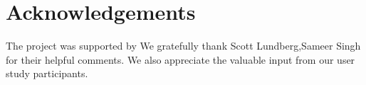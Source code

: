 \section*{Acknowledgements}
The project was supported by 
We gratefully thank Scott Lundberg,Sameer Singh for their helpful comments.
We also appreciate the valuable input from our user study participants.
